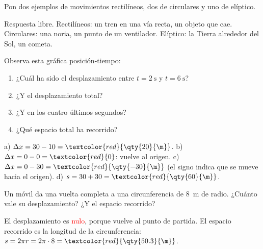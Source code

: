 \begin{exercise}
    Pon dos ejemplos de movimientos rectilíneos, dos de circulares y uno de elíptico.
    \begin{solu}
        Respuesta libre. Rectilíneos: un tren en una vía recta, un objeto que cae. Circulares: una noria, un punto de un ventilador. Elíptico: la Tierra alrededor del Sol, un cometa.
    \end{solu}
\end{exercise}

\begin{exercise}
    Observa esta gráfica posición-tiempo:
    \begin{center}
    \end{center}
    \begin{enumerate}[label=\alph*)]
        \item ¿Cuál ha sido el desplazamiento entre \(t = \qty{2}{\s}\) y \(t = \qty{6}{\s}\)?
        \item ¿Y el desplazamiento total?
        \item ¿Y en los cuatro últimos segundos?
        \item ¿Qué espacio total ha recorrido?
    \end{enumerate}
    \begin{solu}
        a) \(\Delta x = 30 - 10 = \textcolor{red}{\qty{20}{\m}}\). b) \(\Delta x = 0 - 0 = \textcolor{red}{0}\): vuelve al origen. c) \(\Delta x = 0 - 30 = \textcolor{red}{\qty{-30}{\m}}\) (el signo indica que se mueve hacia el origen). d) \(s = 30 + 30 = \textcolor{red}{\qty{60}{\m}}\).
    \end{solu}
\end{exercise}

\begin{exercise}
    Un móvil da una vuelta completa a una circunferencia de \qty{8}{\m} de radio. ¿Cuánto vale su desplazamiento? ¿Y el espacio recorrido?
    \begin{solu}
        El desplazamiento es \textcolor{red}{nulo}, porque vuelve al punto de partida. El espacio recorrido es la longitud de la circunferencia: \(s = 2\pi r = 2\pi \cdot 8 = \textcolor{red}{\qty{50.3}{\m}}\).
    \end{solu}
\end{exercise}

